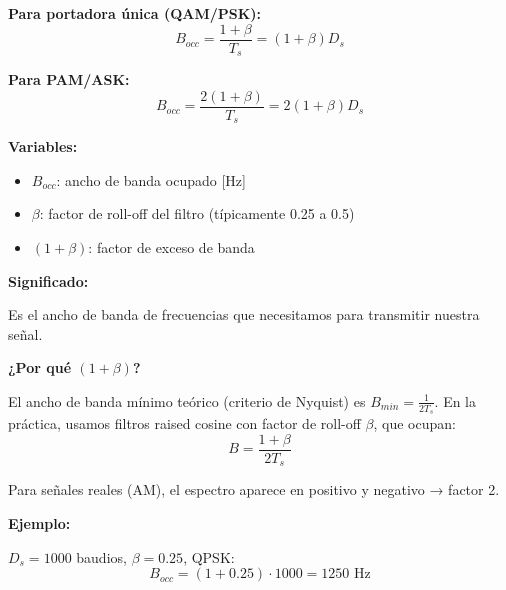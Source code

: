 \documentclass[11pt,a4paper]{article}
\begin{document}
\begin{tcolorbox}[colback=rojoclaro!20,colframe=azuloscuro,title=\textbf{Ancho de banda ocupado}]
\textbf{Para portadora única (QAM/PSK):}
$$\boxed{B_{occ} = \frac{1+\beta}{T_s} = (1+\beta)D_s}$$

\textbf{Para PAM/ASK:}
$$\boxed{B_{occ} = \frac{2(1+\beta)}{T_s} = 2(1+\beta)D_s}$$

\textbf{Variables:}
\begin{itemize}
\item $B_{occ}$: ancho de banda ocupado [Hz]
\item $\beta$: factor de roll-off del filtro (típicamente 0.25 a 0.5)
\item $(1+\beta)$: factor de exceso de banda
\end{itemize}

\textbf{Significado:}

Es el ancho de banda de frecuencias que necesitamos para transmitir nuestra señal.

\textbf{¿Por qué $(1+\beta)$?}

El ancho de banda mínimo teórico (criterio de Nyquist) es $B_{min} = \frac{1}{2T_s}$. En la práctica, usamos filtros raised cosine con factor de roll-off $\beta$, que ocupan:
$$B = \frac{1+\beta}{2T_s}$$

Para señales reales (AM), el espectro aparece en positivo y negativo → factor 2.

\textbf{Ejemplo:}

$D_s = 1000$ baudios, $\beta = 0.25$, QPSK:
$$B_{occ} = (1+0.25) \cdot 1000 = 1250 \text{ Hz}$$
\end{tcolorbox}
\end{document}
